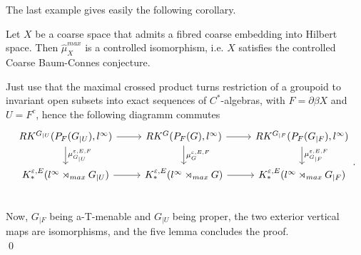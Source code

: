 The last example gives easily the following corollary.

\begin{cor}
Let $X$ be a coarse space that admits a fibred coarse embedding into Hilbert space. Then $\hat \mu_{X}^{max}$ is a controlled isomorphism, i.e. $X$ satisfies the controlled Coarse Baum-Connes conjecture.
\end{cor}

\begin{dem}
Just use that the maximal crossed product turns restriction of a groupoid to invariant open subsets into exact sequences of $C^*$-algebras, with $F=\partial\beta X$ and $U= F^c$, hence the following diagramm commutes
\[\begin{tikzcd}
RK^{G_{|U}}(P_F(G_{|U}),l^\infty)\arrow{r}\arrow{d}{\mu_{G_{|U}}^{\varepsilon,E,F}} & RK^G(P_F(G),l^\infty)\arrow{r}\arrow{d}{\mu_{G}^{\varepsilon,E,F}}  & RK^{G_{|F}}(P_F(G_{|F}),l^\infty)\arrow{d}{\mu_{G_{|F}}^{\varepsilon,E,F}}  \\
K_*^{\varepsilon,E}(l^\infty \rtimes_{max} G_{|U}) \arrow{r} & K_*^{\varepsilon,E}(l^\infty \rtimes_{max} G) \arrow{r} & K_*^{\varepsilon,E}(l^\infty \rtimes_{max} G_{|F}) \\
\end{tikzcd}.\]
Now, $G_{|F}$ being a-T-menable and $G_{|U}$ being proper, the two exterior vertical maps are isomorphisms, and the five lemma concludes the proof.\\
\qed
\end{dem}


